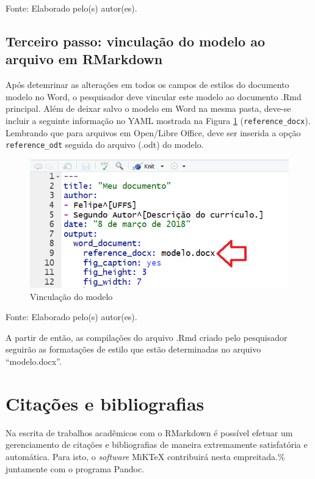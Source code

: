 \documentclass[12pt,brazil,oneside]{book}
\begin{document}
Fonte: Elaborado pelo(s) autor(es).

\hypertarget{terceiro-passo-vinculacao-do-modelo-ao-arquivo-em-rmarkdown}{%
\subsection{Terceiro passo: vinculação do modelo ao arquivo em
RMarkdown}\label{terceiro-passo-vinculacao-do-modelo-ao-arquivo-em-rmarkdown}}

Após detemrinar as alterações em todos os campos de estilos do documento
modelo no Word, o pesquisador deve vincular este modelo ao documento
.Rmd principal. Além de deixar salvo o modelo em Word na mesma pasta,
deve-se incluir a seguinte informação no YAML mostrada na Figura
\ref{fig:rmarkestilos2} (\texttt{reference\_docx}). Lembrando que para
arquivos em Open/Libre Office, deve ser inserida a opção
\texttt{reference\_odt} seguida do arquivo (.odt) do modelo.

\begin{figure}[H]

{\centering \includegraphics[width=0.6\linewidth]{rmarkestilos2} 

}

\caption{Vinculação do modelo}\label{fig:rmarkestilos2}
\end{figure}

Fonte: Elaborado pelo(s) autor(es).

A partir de então, as compilações do arquivo .Rmd criado pelo
pesquisador seguirão as formatações de estilo que estão determinadas no
arquivo ``modelo.docx''.

\hypertarget{citacoes-e-bibliografias}{%
\section{Citações e bibliografias}\label{citacoes-e-bibliografias}}

Na escrita de trabalhos acadêmicos com o RMarkdown é possível efetuar um
gerenciamento de citações e bibliografias de maneira extremamente
satisfatória e automática. Para isto, o \emph{software} MiKTeX
contribuirá nesta empreitada.\% juntamente com o programa Pandoc.
\end{document}
